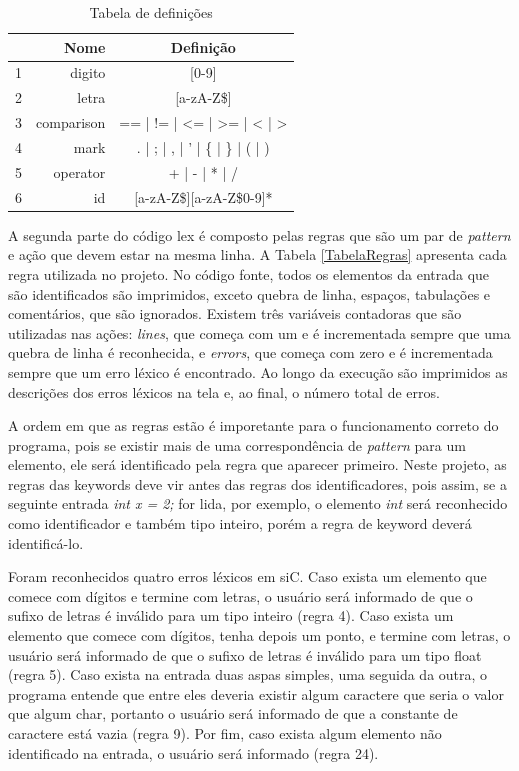 \documentclass[12pt]{article}
\begin{document}
\begin{table}
 \centering
 \begin{tabular}{| c || r  c |}
  \hline
   & Nome & Definição \\
  \hline  \hline
  1 & digito & [0-9] \\
  \hline
  2 & letra & [a-zA-Z\$] \\
  \hline
  3 & comparison & == | != | <= | >= | < | > \\
  \hline
  4 & mark & . | ; | , | ' | \{ | \} | ( | ) \\
  \hline
  5 & operator & + | - | * | / \\
  \hline
  6 & id & [a-zA-Z\$][a-zA-Z\$0-9]* \\
  \hline
\end{tabular}
\caption{Tabela de definições}
\label{TabelaDef}
\end{table}
 
\indent A segunda parte do código lex é composto pelas regras que são um par de \textit{pattern} e ação que devem estar na mesma linha. A Tabela \ref{TabelaRegras} apresenta cada regra utilizada no projeto. No código fonte, todos os elementos da entrada que são identificados são imprimidos, exceto quebra de linha, espaços, tabulações e comentários, que são ignorados. Existem três variáveis contadoras que são utilizadas nas ações: \textit{lines}, que começa com um e é incrementada sempre que uma quebra de linha é reconhecida, e \textit{errors}, que começa com zero e é incrementada sempre que um erro léxico é encontrado. Ao longo da execução são imprimidos as descrições dos erros léxicos na tela e, ao final, o número total de erros.

\indent A ordem em que as regras estão é imporetante para o funcionamento correto do programa, pois se existir mais de uma correspondência de \textit{pattern} para um elemento, ele será identificado pela regra que aparecer primeiro. Neste projeto, as regras das keywords deve vir antes das regras dos identificadores, pois assim, se a seguinte entrada \textit{int x = 2;} for lida, por exemplo, o elemento \textit{int} será reconhecido como identificador e também tipo inteiro, porém a regra de keyword deverá identificá-lo.

\indent Foram reconhecidos quatro erros léxicos em siC. Caso exista um elemento que comece com dígitos e termine com letras, o usuário será informado de que o sufixo de letras é inválido para um tipo inteiro (regra 4). Caso exista um elemento que comece com dígitos, tenha depois um ponto, e termine com letras, o usuário será informado de que o sufixo de letras é inválido para um tipo float (regra 5). Caso exista na entrada duas aspas simples, uma seguida da outra, o programa entende que entre eles deveria existir algum caractere que seria o valor que algum char, portanto o usuário será informado de que a constante de caractere está vazia (regra 9). Por fim, caso exista algum elemento não identificado na entrada, o usuário será informado (regra 24).
\end{document}
